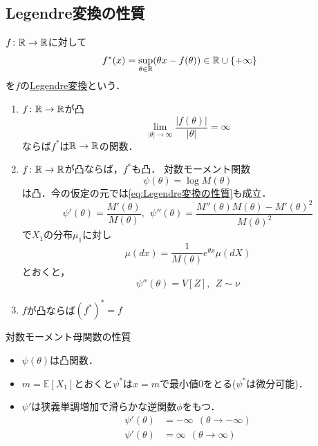 \documentclass[dvipdfmx, leqno]{jsbook}
\begin{document}
\subsection{Legendre変換の性質}
    $f\colon \mathbb{R}\to \mathbb{R}$に対して
\begin{equation}
    f^*(x)= \sup_{\theta\in \mathbb{R}} (\theta x- f(\theta))\in \mathbb{R}\cup \{+\infty\}
\end{equation}
    を$f$の\underline{Legendre変換}という．
\begin{enumerate}
    \item $f\colon \mathbb{R}\to \mathbb{R}$が凸
\begin{equation} \label{eq:Legendre変換の性質}
    \lim_{|\theta|\to \infty} \frac{|f(\theta)|}{|\theta|}= \infty
\end{equation}
    ならば$f^*$は$\mathbb{R}\to \mathbb{R}$の関数．
    \item $f\colon \mathbb{R}\to \mathbb{R}$が凸ならば，$f^*$も凸．
    対数モーメント関数
\begin{equation}
    \psi(\theta)= \log{M(\theta)}
\end{equation}
    は凸．今の仮定の元では\eqref{eq:Legendre変換の性質}も成立．
\begin{equation}
    \psi'(\theta)= \frac{M'(\theta)}{M(\theta)},\ \ \psi''(\theta)= \frac{M''(\theta)M(\theta)- M'(\theta)^2}{M(\theta)^2}
\end{equation}
    で$X_1$の分布$\mu_1$に対し  
\begin{equation}
    \mu(dx)= \frac{1}{M(\theta)}e^{\theta x}\mu(dX)
\end{equation}
    とおくと，
\begin{equation}
    \psi''(\theta)= V[Z],\ \ Z\sim \nu
\end{equation}
    \item $f$が凸ならば$(f^*)^*= f$
\end{enumerate}
    対数モーメント母関数の性質
\begin{itemize}
    \item $\psi(\theta)$は凸関数．
    \item $m= \mathbb{E}[X_1]$とおくと$\psi^*$は$x= m$で最小値0をとる($\psi^*$は微分可能)．
    \item $\psi'$は狭義単調増加で滑らかな逆関数$\phi$をもつ．
\begin{align}
    \psi'(\theta)&= -\infty\ \ (\theta\to -\infty)\\
    \psi'(\theta)&= \infty\ \ (\theta\to \infty)
\end{align}
\end{itemize}
\end{document}

